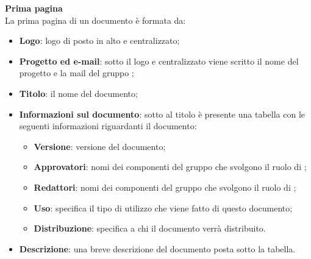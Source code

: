 \textbf{Prima pagina}\\
La prima pagina di un documento è formata da:
\begin{itemize}
	
	\item \textbf{Logo}: logo di \Gruppo{} posto in alto e centralizzato;
	
	\item \textbf{Progetto ed e-mail}: sotto il logo e centralizzato viene scritto il nome del progetto e la mail del gruppo \Gruppo{};
	
	\item \textbf{Titolo}: il nome del documento;
	
	\item \textbf{Informazioni sul documento}: sotto al titolo è presente una tabella con le seguenti informazioni riguardanti il documento:
	
	\begin{itemize}
		
		\item \textbf{Versione}: versione del documento;
		
		\item \textbf{Approvatori}: nomi dei componenti del gruppo che svolgono il ruolo di ;
		
		\item \textbf{Redattori}: nomi dei componenti del gruppo che svolgono il ruolo di ;
	 	
	 	\item \textbf{Uso}: specifica il tipo di utilizzo che viene fatto di questo documento;
	 	
	 	\item \textbf{Distribuzione}: specifica a chi il documento verrà distribuito.
	 	
	\end{itemize}
	
	\item \textbf{Descrizione}: una breve descrizione del documento posta sotto la tabella.
\end{itemize}

\mbox{}

